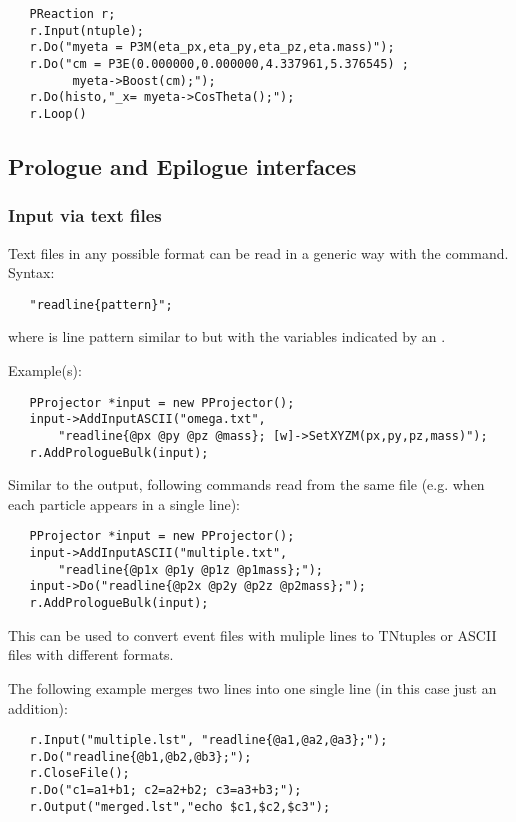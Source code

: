 {\begin{verbatim}
   PReaction r;
   r.Input(ntuple);
   r.Do("myeta = P3M(eta_px,eta_py,eta_pz,eta.mass)");
   r.Do("cm = P3E(0.000000,0.000000,4.337961,5.376545) ; 
         myeta->Boost(cm);");
   r.Do(histo,"_x= myeta->CosTheta();");
   r.Loop()
\end{verbatim}

\subsection{Prologue and Epilogue interfaces}

\subsubsection{Input via text files}

Text files in any possible format can be read in a generic way with the 
 command. Syntax:

\begin{verbatim}
   "readline{pattern}";
\end{verbatim}

where  is line pattern similar to
 but with the variables indicated by an \@.

Example(s):

\begin{verbatim}
   PProjector *input = new PProjector();
   input->AddInputASCII("omega.txt", 
       "readline{@px @py @pz @mass}; [w]->SetXYZM(px,py,pz,mass)");
   r.AddPrologueBulk(input);
\end{verbatim}

Similar to the output, following  commands read from the
same file (e.g. when each particle appears in a single line):

\begin{verbatim}
   PProjector *input = new PProjector();
   input->AddInputASCII("multiple.txt", 
       "readline{@p1x @p1y @p1z @p1mass};");
   input->Do("readline{@p2x @p2y @p2z @p2mass};");
   r.AddPrologueBulk(input);
\end{verbatim}

This can be used to convert event files with muliple lines to TNtuples
    or ASCII files with different formats.

The following example merges two lines into one single line (in this case just an addition):

\begin{verbatim}
   r.Input("multiple.lst", "readline{@a1,@a2,@a3};");
   r.Do("readline{@b1,@b2,@b3};"); 
   r.CloseFile();
   r.Do("c1=a1+b1; c2=a2+b2; c3=a3+b3;");
   r.Output("merged.lst","echo $c1,$c2,$c3");
\end{verbatim}

}
